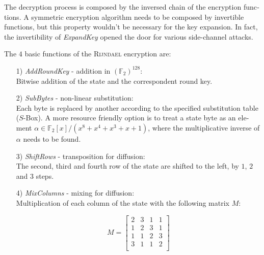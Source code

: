 \documentclass[a4paper,11pt]{article}
\begin{document}
\begin{otherlanguage}{english}
\begin{multicols}{2}
\noindent
The decryption process is composed by the inversed chain of the encryption functions. A symmetric encryption algorithm needs to be composed by invertible functions, but this property wouldn't be necessary for the key expansion. In fact, the invertibility of \textit{ExpandKey} opened the door for various side-channel attacks. 

The $4$ basic functions of the \textsc{Rijndael} encryption are: \\

\begin{itemize} [noitemsep, nolistsep]
  \item[1)] \textit{AddRoundKey} - addition in ${(\mathbb{F}_2)}^{128}$: \\ 
  Bitwise addition of the state and the correspondent round key.
  \vspace{0.1cm}

  \item[2)] \textit{SubBytes} - non-linear substitution: \\
  Each byte is replaced by another according to the specified substitution table ($S$-Box). A more resource friendly option is to treat a state byte as an element $\alpha \in \mathbb{F}_2 [x]/(x^8 + x^4 + x^3 + x + 1)$, where the multiplicative inverse of $\alpha$ needs to be found.
  \vspace{0.1cm}

  \item[3)] \textit{ShiftRows} - transposition for diffusion: \\
  The second, third and fourth row of the state are shifted to the left, by $1$, $2$ and $3$ steps.
  \vspace{0.1cm}

  \item[4)] \textit{MixColumns} - mixing for diffusion: \\
  Multiplication of each column of the state with the following matrix $M$:

  $$ 
  	M = 
  	\begin{bmatrix}
  		2 & 3 & 1 & 1 \\ 
  	 	1 & 2 & 3 & 1 \\
  	 	1 & 1 & 2 & 3 \\
  	 	3 & 1 & 1 & 2 \\
  	\end{bmatrix}
  $$

\end{itemize} 


\end{multicols}
\end{otherlanguage}
\end{document}
